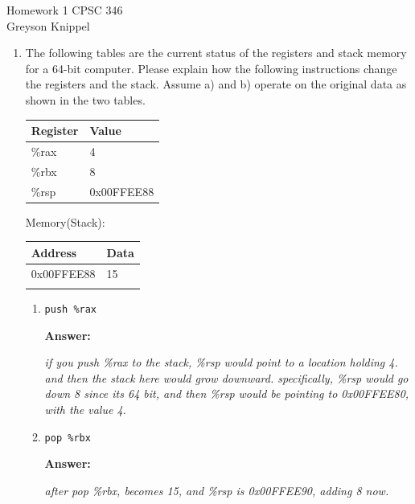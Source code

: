 \documentclass[11pt]{article}
\newcommand{\myname}{Greyson Knippel}
\newenvironment{answer}
  {\par\vspace{0.5em}\noindent\textbf{Answer:}\par\vspace{0.25em}\begingroup\itshape}
  {\endgroup\par\vspace{1em}}
\begin{document}
\begin{center}
  {\Large Homework 1 \quad CPSC 346}\\[0.5em]
  \myname
\end{center}

\vspace{1em}

\begin{enumerate}[leftmargin=*]

\item The following tables are the current status of the registers and stack
memory for a 64-bit computer. Please explain how the following instructions change the
registers and the stack. Assume a) and b) operate on the original data as shown in the
two tables.

\begin{center}
\begin{tabular}{|l|l|}
\hline
Register & Value \\
\hline
\%rax & 4 \\
\hline
\%rbx & 8 \\
\hline
\%rsp & 0x00FFEE88 \\
\hline
\end{tabular}
\end{center}

\vspace{0.5em}
\noindent\hspace{1em} Memory(Stack):

\begin{center}
\begin{tabular}{|p{1.2in}|p{1.2in}|}
\hline
Address & Data \\
\hline
0x00FFEE88 & 15 \\
\hline
 & \\
\hline
\end{tabular}
\end{center}

\begin{enumerate}[label=\alph*)]
  \item \verb|push %rax|
  \begin{answer}
    if you push \%rax to the stack, \%rsp would point to a location holding 4. and then the stack here would
    grow downward. specifically, \%rsp would go down 8 since its 64 bit, and then \%rsp would be pointing to 0x00FFEE80,
    with the value 4.
  \end{answer}

  \item \verb|pop %rbx|
  \begin{answer}
    after pop \%rbx, becomes 15, and \%rsp is 0x00FFEE90, adding 8 now. 
  \end{answer}
\end{enumerate}


\end{enumerate}
\end{document}
